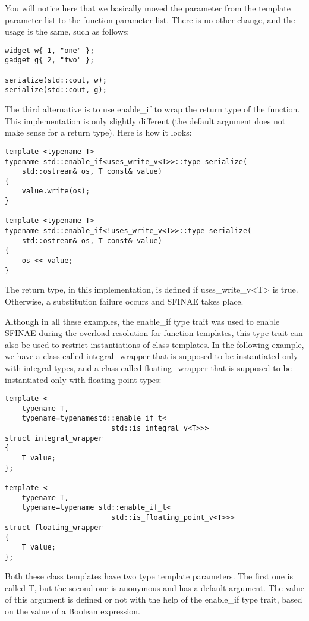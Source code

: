 You will notice here that we basically moved the parameter from the template parameter list to the function parameter list. There is no other change, and the usage is the same, such as follows:

\begin{lstlisting}[style=styleCXX]
widget w{ 1, "one" };
gadget g{ 2, "two" };

serialize(std::cout, w);
serialize(std::cout, g);
\end{lstlisting}

The third alternative is to use enable\_if to wrap the return type of the function. This implementation is only slightly different (the default argument does not make sense for a return type). Here is how it looks:

\begin{lstlisting}[style=styleCXX]
template <typename T>
typename std::enable_if<uses_write_v<T>>::type serialize(
	std::ostream& os, T const& value)
{
	value.write(os);
}

template <typename T>
typename std::enable_if<!uses_write_v<T>>::type serialize(
	std::ostream& os, T const& value)
{
	os << value;
}
\end{lstlisting}

The return type, in this implementation, is defined if uses\_write\_v<T> is true. Otherwise, a substitution failure occurs and SFINAE takes place.

Although in all these examples, the enable\_if type trait was used to enable SFINAE during the overload resolution for function templates, this type trait can also be used to restrict instantiations of class templates. In the following example, we have a class called integral\_wrapper that is supposed to be instantiated only with integral types, and a class called floating\_wrapper that is supposed to be instantiated only with floating-point types:

\begin{lstlisting}[style=styleCXX]
template <
	typename T,
	typename=typenamestd::enable_if_t<
						 std::is_integral_v<T>>>
struct integral_wrapper
{
	T value;
};

template <
	typename T,
	typename=typename std::enable_if_t<
						 std::is_floating_point_v<T>>>
struct floating_wrapper
{
	T value;
};
\end{lstlisting}

Both these class templates have two type template parameters. The first one is called T, but the second one is anonymous and has a default argument. The value of this argument is defined or not with the help of the enable\_if type trait, based on the value of a Boolean expression.

